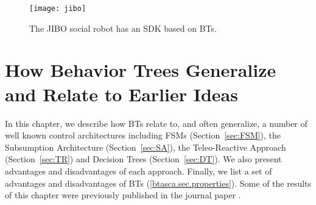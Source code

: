 \begin{figure}[ht]
\centering
  \texttt{[image: jibo]}
  \caption{The JIBO social robot has an SDK based on BTs.}
  \label{jibo}
\end{figure}



%
%

\chapter{How Behavior Trees Generalize and Relate to Earlier Ideas}
\label{ch:earlier_ideas}

In this chapter, we describe how BTs relate to, and often generalize, a number of well known control architectures including FSMs (Section~\ref{sec:FSM}),
the Subsumption Architecture (Section~\ref{sec:SA}), the Teleo-Reactive Approach (Section~\ref{sec:TR}) and Decision Trees (Section~\ref{sec:DT}). We also present advantages and disadvantages of each approach.
Finally, we list a set of advantages and disadvantages of BTs %
(\ref{btasca.sec.properties}).
Some of the results of this chapter were previously published in the journal paper \cite{colledanchise2017behavior}.

\label{btasca.sec.ca}

